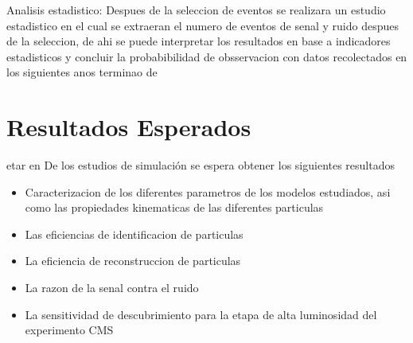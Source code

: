 Analisis estadistico: Despues de la seleccion de eventos se realizara un estudio estadistico en el cual se extraeran el numero de eventos de senal y ruido despues de la seleccion, de ahi se puede interpretar los resultados en base a indicadores estadisticos y concluir la probabibilidad de obsservacion con datos recolectados en los siguientes anos terminao de


\chapter{Resultados Esperados} 

etar en De los estudios de simulaci\'on se espera obtener los siguientes resultados

\begin{itemize}
\item Caracterizacion de los diferentes parametros de los modelos estudiados, asi como las propiedades kinematicas de las diferentes particulas 
\item Las eficiencias de identificacion de particulas 
\item La eficiencia de reconstruccion de particulas 
\item La razon de la senal contra el ruido 
\item La sensitividad de descubrimiento para la etapa de alta luminosidad del experimento CMS
\end{itemize}




